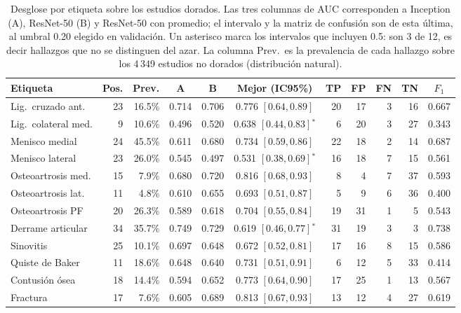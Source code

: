 \begin{table}[ht]
\centering
\caption{Desglose por etiqueta sobre los estudios dorados. Las tres columnas de AUC corresponden a Inception (A), ResNet-50 (B) y ResNet-50 con promedio; el intervalo y la matriz de confusión son de esta última, al umbral 0.20 elegido en validación. Un asterisco marca los intervalos que incluyen 0.5: son 3 de 12, es decir hallazgos que no se distinguen del azar. La columna Prev.\ es la prevalencia de cada hallazgo sobre los 4\,349 estudios no dorados (distribución natural).}
\label{tab:etiquetas}
\begin{tabular}{lrrcccrrrrc}
\toprule
Etiqueta & Pos. & Prev. & A & B & Mejor (IC95\%) & TP & FP & FN & TN & $F_1$ \\
\midrule
Lig.\ cruzado ant. & 23 & 16.5\% & 0.714 & 0.706 & 0.776 $[0.64, 0.89]$ & 20 & 17 & 3 & 16 & 0.667 \\
Lig.\ colateral med. & 9 & 10.6\% & 0.496 & 0.520 & 0.638 $[0.44, 0.83]$$^{*}$ & 6 & 20 & 3 & 27 & 0.343 \\
Menisco medial & 24 & 45.5\% & 0.611 & 0.680 & 0.734 $[0.59, 0.86]$ & 22 & 18 & 2 & 14 & 0.687 \\
Menisco lateral & 23 & 26.0\% & 0.545 & 0.497 & 0.531 $[0.38, 0.69]$$^{*}$ & 16 & 18 & 7 & 15 & 0.561 \\
Osteoartrosis med. & 15 & 7.9\% & 0.680 & 0.720 & 0.816 $[0.68, 0.93]$ & 8 & 4 & 7 & 37 & 0.593 \\
Osteoartrosis lat. & 11 & 4.8\% & 0.610 & 0.655 & 0.693 $[0.51, 0.87]$ & 5 & 9 & 6 & 36 & 0.400 \\
Osteoartrosis PF & 20 & 26.3\% & 0.589 & 0.618 & 0.704 $[0.55, 0.84]$ & 19 & 31 & 1 & 5 & 0.543 \\
Derrame articular & 34 & 35.7\% & 0.749 & 0.729 & 0.619 $[0.46, 0.77]$$^{*}$ & 31 & 19 & 3 & 3 & 0.738 \\
Sinovitis & 25 & 10.1\% & 0.697 & 0.648 & 0.672 $[0.52, 0.81]$ & 17 & 16 & 8 & 15 & 0.586 \\
Quiste de Baker & 11 & 18.6\% & 0.648 & 0.640 & 0.731 $[0.51, 0.91]$ & 6 & 12 & 5 & 33 & 0.414 \\
Contusión ósea & 18 & 14.4\% & 0.594 & 0.652 & 0.773 $[0.64, 0.90]$ & 17 & 25 & 1 & 13 & 0.567 \\
Fractura & 17 & 7.6\% & 0.605 & 0.689 & 0.813 $[0.67, 0.93]$ & 13 & 12 & 4 & 27 & 0.619 \\
\bottomrule
\end{tabular}
\end{table}
